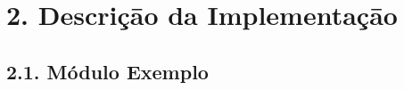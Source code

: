 \section*{2. Descriçāo da Implementaçāo}

\subsection*{2.1. Módulo Exemplo}
\inputminted{vhdl}{code/example.vhd}

